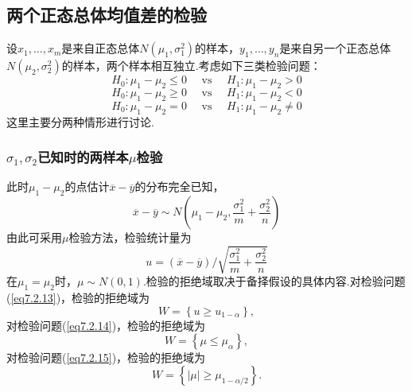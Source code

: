 \subsection{两个正态总体均值差的检验\label{7.2.2}}
设$x_{1},\dotsc,x_{m}$是来自正态总体$N(\mu_{ 1 },\sigma_{1}^{2})$的样本，$y_{1},\dotsc,y_{n}$是来自另一个正态总体$N(\mu_{ 2 },\sigma_{2}^{2})$的样本，两个样本相互独立.考虑如下三类检验问题：
\begin{equation}\label{eq7.2.13}
H _ { 0 } : \mu _ { 1 } - \mu _ { 2 } \leq 0 \quad \text { vs } \quad H _ { 1 } : \mu _ { 1 } - \mu _ { 2 } > 0
\end{equation}
\begin{equation}\label{eq7.2.14}
H _ { 0 } : \mu _ { 1 } - \mu _ { 2 } \geq 0 \quad \text { vs } \quad H _ { 1 } : \mu _ { 1 } - \mu _ { 2 } < 0
\end{equation}
\begin{equation}\label{eq7.2.15}
H _ { 0 } : \mu _ { 1 } - \mu _ { 2 } = 0 \quad \text { vs } \quad H _ { 1 } : \mu _ { 1 } - \mu _ { 2 } \ne  0
\end{equation}
这里主要分两种情形进行讨论.

\subsubsection{$\sigma_{1},\sigma_{2}$已知时的两样本$\mu$检验}

此时$\mu_{ 1 }-\mu_{ 2 }$的点估计$\overline{ x}-\overline{y}$的分布完全已知，
\[\overline { x } - \overline { y } \sim N \left( \mu _ { 1 } - \mu _ { 2 } , \frac { \sigma _ { 1 } ^ { 2 } } { m } + \frac { \sigma _ { 2 } ^ { 2 } } { n } \right)\]
由此可采用$\mu$检验方法，检验统计量为
\[u = ( \overline { x } - \overline { y } ) / \sqrt { \frac { \sigma _ { 1 } ^ { 2 } } { m } + \frac { \sigma _ { 2 } ^ { 2 } } { n } }\]
在$\mu_{ 1 }=\mu_{ 2 }$时，$\mu\sim N(0,1)$.检验的拒绝域取决于备择假设的具体内容.对检验问题(\ref{eq7.2.13})，检验的拒绝域为
\begin{equation}\label{eq7.2.16}
  W=\left\{u\geq u_{1-\alpha}\right\},
\end{equation}
对检验问题(\ref{eq7.2.14})，检验的拒绝域为
\begin{equation}\label{eq7.2.17}
  W=\left\{\mu\leq\mu_{\alpha}\right\},
\end{equation}
对检验问题(\ref{eq7.2.15})，检验的拒绝域为
\begin{equation}\label{eq7.2.18}
  W=\left\{\left|\mu\right|\geq\mu_{1-\alpha/2}\right\}.
\end{equation}

